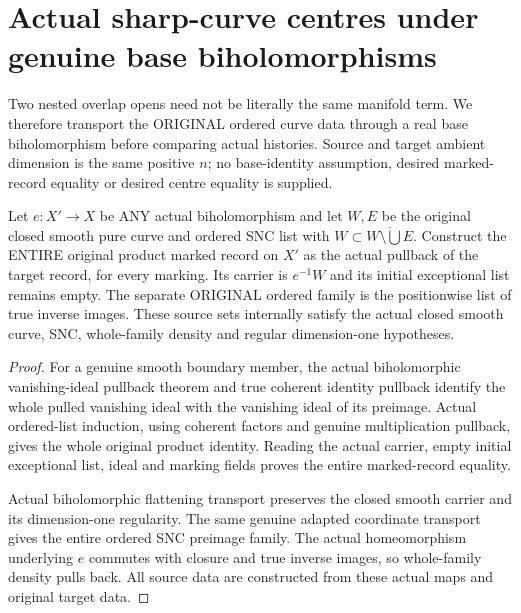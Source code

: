 \section{Actual sharp-curve centres under genuine base biholomorphisms}

Two nested overlap opens need not be literally the same manifold term.
We therefore transport the ORIGINAL ordered curve data through a real
base biholomorphism before comparing actual histories. Source and
target ambient dimension is the same positive $n$; no base-identity
assumption, desired marked-record equality or desired centre equality
is supplied.

\begin{theorem}
\label{hir:sharp-actual-original-curve-biholomorphic-base-inputs}
\leanok
Let $e:X'\to X$ be ANY actual biholomorphism and let $W,E$ be the
original closed smooth pure curve and ordered SNC list with
$W\subset\overline{W\setminus\bigcup E}$. Construct the ENTIRE original
product marked record on $X'$ as the actual pullback of the target
record, for every marking. Its carrier is $e^{-1}W$ and its initial
exceptional list remains empty. The separate ORIGINAL ordered family
is the positionwise list of true inverse images. These source
sets internally satisfy the actual closed smooth curve, SNC,
whole-family density and regular dimension-one hypotheses.
\end{theorem}
\begin{proof}
For a genuine smooth boundary member, the actual biholomorphic
vanishing-ideal pullback theorem and true coherent identity pullback
identify the whole pulled vanishing ideal with the vanishing ideal of
its preimage. Actual ordered-list induction, using coherent factors
and genuine multiplication pullback, gives the whole original product
identity. Reading the actual carrier, empty initial exceptional list,
ideal and marking fields proves the entire marked-record equality.

Actual biholomorphic flattening transport preserves the closed smooth
carrier and its dimension-one regularity. The same genuine adapted
coordinate transport gives the entire ordered SNC preimage family.
The actual homeomorphism underlying $e$ commutes with closure and true
inverse images, so whole-family density pulls back. All source data
are constructed from these actual maps and original target data.
\end{proof}

